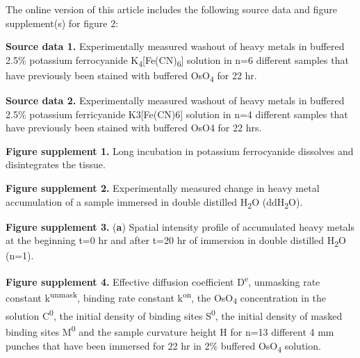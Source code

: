 \documentclass{article}
\begin{document}
\noindent The online version of this article includes the following source data and figure supplement(s) for figure 2:

\noindent\textbf{Source data 1.} Experimentally measured washout of heavy metals in buffered 2.5\% potassium ferrocyanide K\textsubscript{4}[Fe(CN)\textsubscript{6}] solution in n=6 different samples that have previously been stained with buffered OsO\textsubscript{4} for 22 hr.

\noindent\textbf{Source data 2.} Experimentally measured washout of heavy metals in buffered 2.5\% potassium ferricyanide K3[Fe(CN)6] solution in n=4 different samples that have previously been stained with buffered OsO4 for 22 hrs.

\noindent\textbf{Figure supplement 1.} Long incubation in potassium ferrocyanide dissolves and disintegrates the tissue.

\noindent\textbf{Figure supplement 2.} Experimentally measured change in heavy metal accumulation of a sample immersed in double distilled H\textsubscript{2}O (ddH\textsubscript{2}O).

\noindent\textbf{Figure supplement 3.} (\textbf{a}) Spatial intensity profile of accumulated heavy metals at the beginning t=0 hr and after t=20 hr of immersion in double distilled H\textsubscript{2}O (n=1).

\noindent\textbf{Figure supplement 4.} Effective diffusion coefficient D\textsuperscript{e}, unmasking rate constant k\textsuperscript{unmask}, binding rate constant k\textsuperscript{on}, the OsO\textsubscript{4} concentration in the solution C\textsuperscript{0}, the initial density of binding sites S\textsuperscript{0}, the initial density of masked binding sites M\textsuperscript{0} and the sample curvature height H for n=13 different 4 mm punches that have been immersed for 22 hr in 2\% buffered OsO\textsubscript{4} solution.
\end{document}

